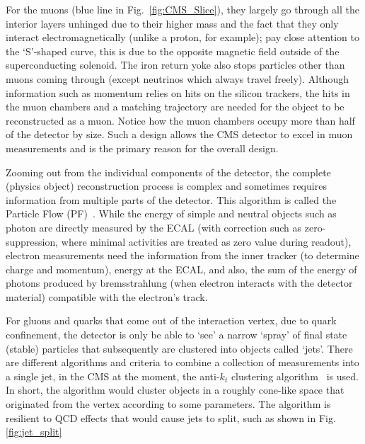 For the muons (blue line in Fig.~\ref{fig:CMS_Slice}), they largely go through all the interior layers unhinged 
due to their higher mass and the fact that they only interact electromagnetically (unlike a proton, for example);
pay close attention to the `S'-shaped curve, this is due to the opposite magnetic
field outside of the superconducting solenoid. The iron return yoke also stops particles other than
muons coming through (except neutrinos which always travel freely). Although information such as momentum relies on
hits on the silicon trackers, the hits in the muon chambers and a matching trajectory are needed 
for the object to be reconstructed as a muon. Notice how the
muon chambers occupy more than half of the detector by size. Such a design allows the CMS 
detector to excel in muon measurements and is the primary reason for the overall design.

Zooming out from the individual components of the detector, the complete (physics object) reconstruction
process is complex and sometimes requires information from multiple parts of the detector. This
algorithm is called the Particle Flow (PF)~\cite{particle_flow}. While the energy of simple and neutral 
objects such as photon are directly measured by the ECAL (with correction such as zero-suppression, where minimal
activities are treated as zero value during readout), electron measurements
need the information from the inner tracker (to determine charge and momentum), energy at the ECAL, and
also, the sum of the energy of photons produced by bremsstrahlung (when electron interacts with the 
detector material) compatible with the electron's track.

For gluons and quarks that come out of the interaction vertex, due to quark confinement, the detector 
is only be able to `see' a narrow `spray' of final state (stable) particles that subsequently
are clustered into objects called `jets'.
There are different algorithms and criteria to combine a collection of measurements into a single jet,
in the CMS at the moment, the anti-$k_t$ clustering algorithm~\cite{anti_k,fastjet} is used. In short, the algorithm would cluster objects
in a roughly cone-like space that originated from the vertex according to some parameters.
The algorithm is resilient to QCD effects that would cause jets to split, such as shown in Fig.
\ref{fig:jet_split}

